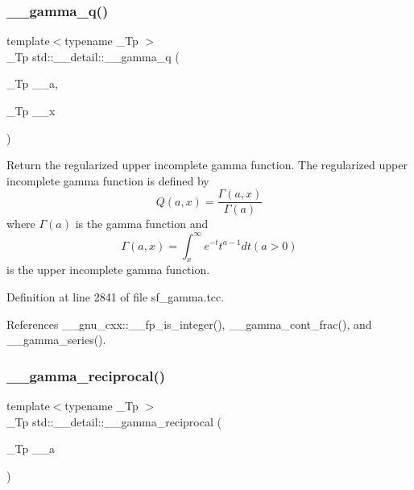 \subsubsection{\texorpdfstring{\+\_\+\+\_\+gamma\+\_\+q()}{\_\_gamma\_q()}\hspace{0.1cm}{\footnotesize\ttfamily [2/2]}}
{\footnotesize\ttfamily template$<$typename \+\_\+\+Tp $>$ \\
\+\_\+\+Tp std\+::\+\_\+\+\_\+detail\+::\+\_\+\+\_\+gamma\+\_\+q (\begin{DoxyParamCaption}\item[{\+\_\+\+Tp}]{\+\_\+\+\_\+a,  }\item[{\+\_\+\+Tp}]{\+\_\+\+\_\+x }\end{DoxyParamCaption})}



Return the regularized upper incomplete gamma function. The regularized upper incomplete gamma function is defined by \[ Q(a,x) = \frac{\Gamma(a,x)}{\Gamma(a)} \] where $ \Gamma(a) $ is the gamma function and \[ \Gamma(a,x) = \int_x^\infty e^{-t}t^{a-1}dt (a > 0) \] is the upper incomplete gamma function. 



Definition at line 2841 of file sf\+\_\+gamma.\+tcc.



References \+\_\+\+\_\+gnu\+\_\+cxx\+::\+\_\+\+\_\+fp\+\_\+is\+\_\+integer(), \+\_\+\+\_\+gamma\+\_\+cont\+\_\+frac(), and \+\_\+\+\_\+gamma\+\_\+series().

\mbox{\label{namespacestd_1_1____detail_a8ac187fda39e0c55614e4c58146f871c}} 
\subsubsection{\texorpdfstring{\+\_\+\+\_\+gamma\+\_\+reciprocal()}{\_\_gamma\_reciprocal()}}
{\footnotesize\ttfamily template$<$typename \+\_\+\+Tp $>$ \\
\+\_\+\+Tp std\+::\+\_\+\+\_\+detail\+::\+\_\+\+\_\+gamma\+\_\+reciprocal (\begin{DoxyParamCaption}\item[{\+\_\+\+Tp}]{\+\_\+\+\_\+a }\end{DoxyParamCaption})}

